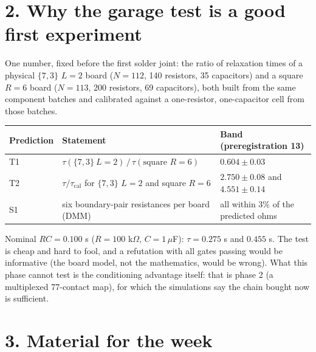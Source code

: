 \documentclass[11pt,a4paper]{article}
\begin{document}
\section*{2. Why the garage test is a good first experiment}
One number, fixed before the first solder joint: the ratio of relaxation times of a physical $\{7,3\}$ $L{=}2$ board
($N=112$, 140 resistors, 35 capacitors) and a square $R{=}6$ board ($N=113$, 200 resistors, 69 capacitors), both built
from the same component batches and calibrated against a one-resistor, one-capacitor cell from those batches.
\begin{center}\small
\begin{tabular}{lll}\toprule
Prediction & Statement & Band (preregistration 13) \\ \midrule
T1 & $\tau(\{7,3\}\ L{=}2)\,/\,\tau(\text{square } R{=}6)$ & $0.604\pm0.03$ \\
T2 & $\tau/\tau_{\mathrm{cal}}$ for $\{7,3\}$ $L{=}2$ and square $R{=}6$ & $2.750\pm0.08$ and $4.551\pm0.14$ \\
S1 & six boundary-pair resistances per board (DMM) & all within $3\%$ of the predicted ohms \\ \bottomrule
\end{tabular}
\end{center}
Nominal $RC=0.100$ s ($R=100$ k$\Omega$, $C=1\,\mu$F): $\tau=0.275$ s and $0.455$ s. The test is cheap and hard to fool, and
a refutation with all gates passing would be informative (the board model, not the mathematics, would be wrong). What
this phase cannot test is the conditioning advantage itself: that is phase 2 (a multiplexed 77-contact map), for which
the simulations say the chain bought now is sufficient.

\section*{3. Material for the week}
\end{document}
